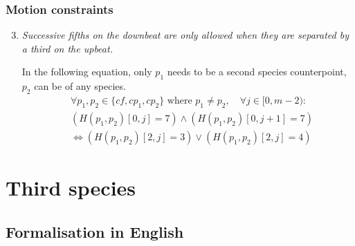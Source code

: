 \subsubsection{Motion constraints}
\begin{enumerate}[wide, label=\bfseries 2.P\arabic*]
\setcounter{enumi}{2} 
    \item \textit{Successive fifths on the downbeat are only allowed when they are separated by a third on the upbeat.} \label{constraint:succ-fifths-flanking-third}    
    
    In the following equation, only $p_1$ needs to be a second species counterpoint, $p_2$ can be of any species.
    \begin{equation}
        \begin{aligned}
            & \forall p_1, p_2 \in \{cf, cp_1, cp_2\} \text{ where }  p_1 \neq p_2, \quad \forall j \in [0, m-2): \\
            & (H(p_1, p_2)[0, j] = 7) \land (H(p_1, p_2)[0, j+1] = 7) \\
            & \iff (H(p_1, p_2)[2, j] = 3) \lor (H(p_1, p_2)[2, j] = 4)
        \end{aligned}
    \end{equation}
\end{enumerate}

\section{Third species}
\subsection{Formalisation in English}\label{formalisation-en-3rd}
